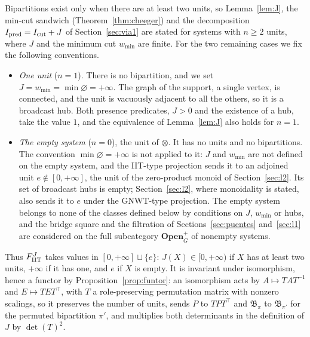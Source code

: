 \begin{remark}\label{rem:small}
Bipartitions exist only when there are at least two units, so Lemma~\ref{lem:J}, the min-cut sandwich (Theorem~\ref{thm:cheeger}) and the decomposition $I_{\rm pred}=I_{\rm cut}+J$ of Section~\ref{sec:via1} are stated for systems with $n\ge2$ units, where $J$ and the minimum cut $w_{\min}$ are finite. For the two remaining cases we fix the following conventions.
\begin{itemize}
\item \emph{One unit} ($n=1$). There is no bipartition, and we set $J=w_{\min}=\min\varnothing=+\infty$. The graph of the support, a single vertex, is connected, and the unit is vacuously adjacent to all the others, so it is a broadcast hub. Both presence predicates, $J>0$ and the existence of a hub, take the value $1$, and the equivalence of Lemma~\ref{lem:J} also holds for $n=1$.
\item \emph{The empty system} ($n=0$), the unit of $\otimes$. It has no units and no bipartitions. The convention $\min\varnothing=+\infty$ is not applied to it: $J$ and $w_{\min}$ are not defined on the empty system, and the IIT-type projection sends it to an adjoined unit $e\notin[0,+\infty]$, the unit of the zero-product monoid of Section~\ref{sec:l2}. Its set of broadcast hubs is empty; Section~\ref{sec:l2}, where monoidality is stated, also sends it to $e$ under the GNWT-type projection. The empty system belongs to none of the classes defined below by conditions on $J$, $w_{\min}$ or hubs, and the bridge square and the filtration of Sections~\ref{sec:puentes} and~\ref{sec:l1} are considered on the full subcategory $\mathbf{Open}_G^{+}$ of nonempty systems.
\end{itemize}
Thus $F_{\rm IIT}^J$ takes values in $[0,+\infty]\sqcup\{e\}$: $J(X)\in[0,+\infty)$ if $X$ has at least two units, $+\infty$ if it has one, and $e$ if $X$ is empty. It is invariant under isomorphism, hence a functor by Proposition~\ref{prop:funtor}: an isomorphism acts by $A\mapsto TAT^{-1}$ and $E\mapsto TET^\top$, with $T$ a role-preserving permutation matrix with nonzero scalings, so it preserves the number of units, sends $P$ to $TPT^\top$ and $\mathfrak B_\pi$ to $\mathfrak B_{\pi'}$ for the permuted bipartition $\pi'$, and multiplies both determinants in the definition of $J$ by $\det(T)^2$.
\end{remark}

